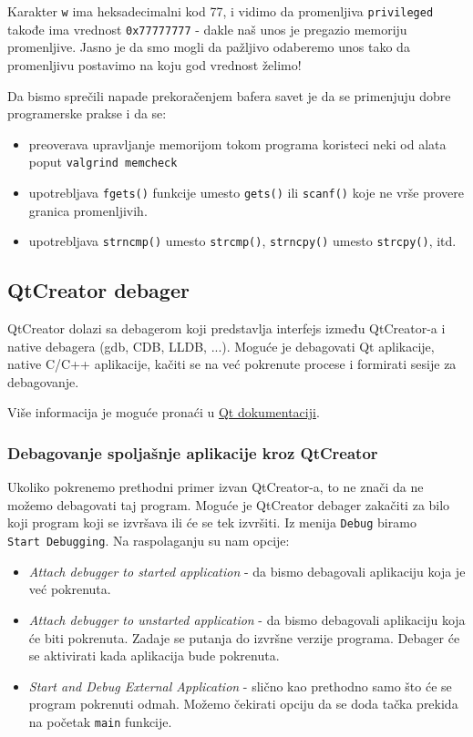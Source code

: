 Karakter \texttt{\textquotesingle{}w\textquotesingle{}} ima heksadecimalni kod 77, i vidimo da promenljiva \texttt{privileged} takođe ima vrednost \texttt{0x77777777} - dakle naš unos je pregazio memoriju promenljive. Jasno je da smo mogli da pažljivo odaberemo unos tako da promenljivu postavimo na koju god vrednost želimo!

Da bismo sprečili napade prekoračenjem bafera savet je da se primenjuju dobre programerske prakse i da se:

\begin{itemize}
\tightlist
\item
  preoverava upravljanje memorijom tokom programa koristeci neki od alata poput \texttt{valgrind\ memcheck}
\item
  upotrebljava \texttt{fgets()} funkcije umesto \texttt{gets()} ili \texttt{scanf()} koje ne vrše provere granica promenljivih.
\item
  upotrebljava \texttt{strncmp()} umesto \texttt{strcmp()}, \texttt{strncpy()} umesto \texttt{strcpy()}, itd.
\end{itemize}

\subsection{QtCreator debager}\label{qtcreator-debugger}

QtCreator dolazi sa debagerom koji predstavlja interfejs između QtCreator-a i native debagera (gdb, CDB, LLDB, ...). Moguće je debagovati Qt aplikacije, native C/C++ aplikacije, kačiti se na već pokrenute procese i formirati sesije za debagovanje.

Više informacija je moguće pronaći u \href{https://doc.qt.io/qtcreator/creator-debugging.html}{Qt dokumentaciji}.

\subsubsection{Debagovanje spoljašnje aplikacije kroz QtCreator}\label{debagovanje-spoljaux161nje-aplikacije-kroz-qtcreator}

Ukoliko pokrenemo prethodni primer izvan QtCreator-a, to ne znači da ne možemo debagovati taj program. Moguće je QtCreator debager zakačiti za bilo koji program koji se izvršava ili će se tek izvršiti. Iz menija \texttt{Debug} biramo \texttt{Start\ Debugging}. Na raspolaganju su nam opcije:

\begin{itemize}
\tightlist
\item
  \emph{Attach debugger to started application} - da bismo debagovali aplikaciju koja je već pokrenuta.
\item
  \emph{Attach debugger to unstarted application} - da bismo debagovali aplikaciju koja će biti pokrenuta. Zadaje se putanja do izvršne verzije programa. Debager će se aktivirati kada aplikacija bude pokrenuta.
\item
  \emph{Start and Debug External Application} - slično kao prethodno samo što će se program pokrenuti odmah. Možemo čekirati opciju da se doda tačka prekida na početak \texttt{main} funkcije.
\end{itemize}

